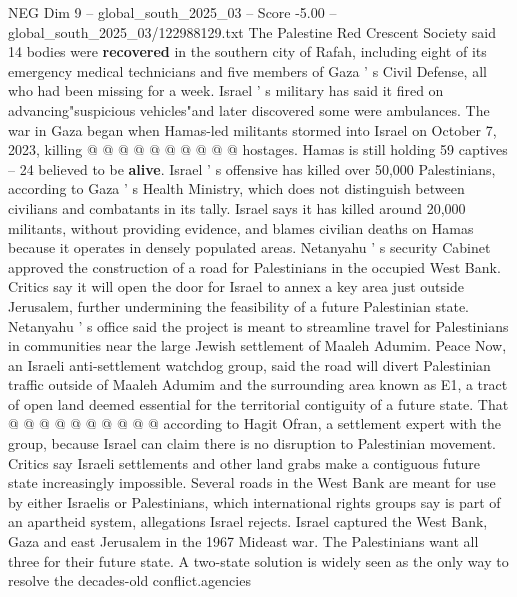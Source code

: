 \begin{textsample}{NEG Dim 9 – global\_south\_2025\_03 – Score -5.00 – global\_south\_2025\_03/122988129.txt}
The Palestine Red Crescent Society said 14 bodies were \textbf{recovered} in the southern city of Rafah, including eight of its emergency medical technicians and five members of Gaza ' s Civil Defense, all who had been missing for a week.
Israel ' s military has said it fired on advancing"suspicious vehicles"and later discovered some were ambulances.
The war in Gaza began when Hamas-led militants stormed into Israel on October 7, 2023, killing @ @ @ @ @ @ @ @ @ @ hostages.
Hamas is still holding 59 captives -- 24 believed to be \textbf{alive}.
Israel ' s offensive has killed over 50,000 Palestinians, according to Gaza ' s Health Ministry, which does not distinguish between civilians and combatants in its tally.
Israel says it has killed around 20,000 militants, without providing evidence, and blames civilian deaths on Hamas because it operates in densely populated areas.
Netanyahu ' s security Cabinet approved the construction of a road for Palestinians in the occupied West Bank.
Critics say it will open the door for Israel to annex a key area just outside Jerusalem, further undermining the feasibility of a future Palestinian state.
Netanyahu ' s office said the project is meant to streamline travel for Palestinians in communities near the large Jewish settlement of Maaleh Adumim.
Peace Now, an Israeli anti-settlement watchdog group, said the road will divert Palestinian traffic outside of Maaleh Adumim and the surrounding area known as E1, a tract of open land deemed essential for the territorial contiguity of a future state.
That @ @ @ @ @ @ @ @ @ @ according to Hagit Ofran, a settlement expert with the group, because Israel can claim there is no disruption to Palestinian movement.
Critics say Israeli settlements and other land grabs make a contiguous future state increasingly impossible.
Several roads in the West Bank are meant for use by either Israelis or Palestinians, which international rights groups say is part of an apartheid system, allegations Israel rejects.
Israel captured the West Bank, Gaza and east Jerusalem in the 1967 Mideast war.
The Palestinians want all three for their future state.
A two-state solution is widely seen as the only way to resolve the decades-old conflict.agencies

\end{textsample}
